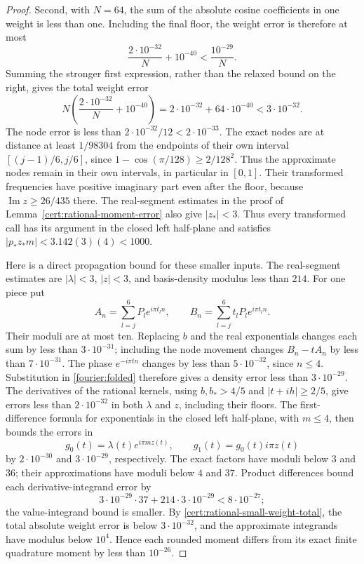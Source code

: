 \begin{proof}
Second, with $N=64$, the sum of the absolute cosine coefficients in
one weight is less than one. Including the final floor, the weight
error is therefore at most
\[
 \frac{2\cdot10^{-32}}N+10^{-40}
 <\frac{10^{-29}}N.
\]
Summing the stronger first expression, rather than the relaxed bound on
the right, gives the total weight error
\begin{equation}\label{cert:rational-small-weight-total}
 N\left(\frac{2\cdot10^{-32}}N+10^{-40}\right)
 =2\cdot10^{-32}+64\cdot10^{-40}<3\cdot10^{-32}.
\end{equation}
The node error is less than $2\cdot10^{-32}/12<2\cdot10^{-33}$.
The exact nodes are at distance at least $1/98304$ from the endpoints
of their own interval $[(j-1)/6,j/6]$, since
$1-\cos(\pi/128)\ge2/128^2$. Thus the approximate nodes remain in their
own intervals, in particular in $[0,1]$. Their transformed frequencies
have positive imaginary part even after the floor, because
$\operatorname{Im}z\ge26/435$ there.  The real-segment estimates in the
proof of Lemma~\ref{cert:rational-moment-error} also give $|z_*|<3$.
Thus every transformed call has its argument in the closed left
half-plane and satisfies $|p_*z_*m|<3.142(3)(4)<1000$.

Here is a direct propagation bound for these smaller inputs. The
real-segment estimates are $|\lambda|<3$, $|z|<3$, and basis-density
modulus less than $214$. For one piece put
\[
 A_n=\sum_{l=j}^6P_le^{i\pi t_ln},\qquad
 B_n=\sum_{l=j}^6t_lP_le^{i\pi t_ln}.
\]
Their moduli are at most ten. Replacing $b$ and the real exponentials
changes each sum by less than $3\cdot10^{-31}$; including the node
movement changes $B_n-tA_n$ by less than $7\cdot10^{-31}$.
The phase $e^{-i\pi tn}$ changes by less than $5\cdot10^{-32}$,
since $n\le4$. Substitution in \eqref{fourier:folded} therefore gives
a density error less than $3\cdot10^{-29}$.
The derivatives of the rational kernels, using $b,b_*>4/5$ and
$|t+ih|\ge2/5$, give errors less than $2\cdot10^{-32}$ in both
$\lambda$ and $z$, including their floors. The first-difference
formula for exponentials in the closed left half-plane, with $m\le4$,
then bounds the errors in
\[
 g_0(t)=\lambda(t)e^{i\pi mz(t)},\qquad
 g_1(t)=g_0(t)i\pi z(t)
\]
by $2\cdot10^{-30}$ and $3\cdot10^{-29}$, respectively.
The exact factors have moduli below $3$ and $36$; their approximations
have moduli below $4$ and $37$. Product differences bound each
derivative-integrand error by
\[
 3\cdot10^{-29}\cdot37+214\cdot3\cdot10^{-29}
 <8\cdot10^{-27};
\]
the value-integrand bound is smaller. By
\eqref{cert:rational-small-weight-total}, the total absolute weight error
is below $3\cdot10^{-32}$, and the approximate integrands have modulus
below $10^4$. Hence each rounded moment differs from its exact finite
quadrature moment by less than $10^{-26}$.


\end{proof}
